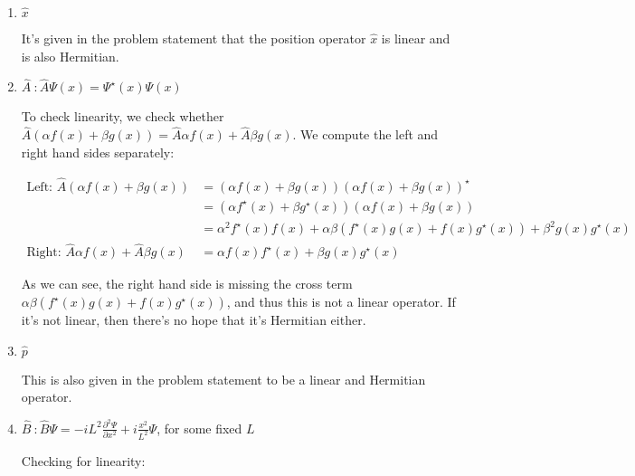 \documentclass{article}
\begin{document}
\begin{enumerate}[label=(\alph*)]
    \item $\hat x$

    \begin{solution}
        It's given in the problem statement that the position operator $\hat x$ is linear and is also Hermitian.
    \end{solution}
    \item $\hat A \ : \hat A \Psi(x) = \Psi^\star(x) \Psi(x)$

        \begin{solution}
            To check linearity, we check whether $\hat A(\alpha f(x) + \beta g(x)) = \hat A \alpha f(x) + \hat A \beta g(x)$. We compute the left and right hand sides separately: 

            \begin{align*}
                \text{Left: } \hat A(\alpha f(x) + \beta g(x)) &= (\alpha f(x) + \beta g(x))(\alpha f(x) + \beta g(x))^\star\\
                &= (\alpha f^\star(x) + \beta g^\star(x))(\alpha f(x) + \beta g(x))\\
                &= \alpha^2 f^\star(x) f(x) + \alpha \beta (f^\star(x) g(x) + f(x) g^\star(x)) + \beta^2 g(x) g^\star(x)\\
                \text{Right: } \hat A \alpha f(x) + \hat A \beta g(x) &= \alpha f(x)f^\star(x) + \beta g(x)g^\star(x)
            \end{align*}

            As we can see, the right hand side is missing the cross term $\alpha \beta (f^\star(x)g(x) + f(x) g^\star(x))$, and thus this is not a linear operator. If it's not linear, then there's no hope that it's Hermitian either.
        \end{solution}
    \item $\hat p$

    \begin{solution}
        This is also given in the problem statement to be a linear and Hermitian operator.
    \end{solution}
    \item $\hat B \ : \hat B \Psi = -iL^2 \frac{\partial^2 \Psi}{\partial x^2} + i\frac{x^2}{L^2}\Psi$, for some fixed $L$
    
    \begin{solution}
        Checking for linearity: 


\end{solution}
\end{enumerate}
\end{document}
